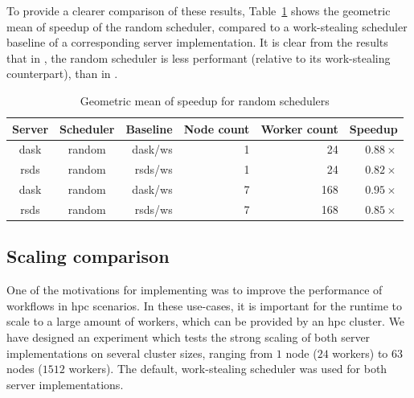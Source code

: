To provide a clearer comparison of these results, Table~\ref{tab:rsds-random-geom-mean-speedup} shows the
geometric mean of speedup of the random scheduler, compared to a work-stealing scheduler baseline
of a corresponding server implementation. It is clear from the results that in
\rsds{}, the random scheduler is less performant (relative to its work-stealing
counterpart), than in \dask{}.

\setlength{\tabcolsep}{5pt}
\begin{table}
	\caption{Geometric mean of speedup for random schedulers}
	\centering
	\label{tab:rsds-random-geom-mean-speedup}
	\begin{tabular}{c|c|r|r|r|r}
		\textbf{Server}      & \textbf{Scheduler} & \textbf{Baseline} & \textbf{Node count} &
		\textbf{Worker	count} & \textbf{Speedup}                                                   \\
		\midrule
		dask                 & random             & dask/ws           & 1                   & 24
		                     & $0.88\times$                                                       \\
		rsds                 & random             & rsds/ws           & 1                   & 24
		                     & $0.82\times$                                                       \\
		dask                 & random             & dask/ws           & 7                   & 168
		                     & $0.95\times$                                                       \\
		rsds                 & random             & rsds/ws           & 7                   & 168
		                     & $0.85\times$                                                       \\
	\end{tabular}
\end{table}

\subsection*{Scaling comparison}
One of the motivations for implementing \rsds{} was to improve the performance
of \dask{} workflows in \gls{hpc} scenarios. In these
use-cases, it is important for the runtime to scale to a large amount of workers, which can be
provided by an \gls{hpc} cluster. We have designed an experiment which tests the
strong scaling of both server implementations on several cluster sizes, ranging from
$1$ node ($24$ workers) to $63$
nodes ($1512$ workers). The default, work-stealing scheduler was used for both
server implementations.

